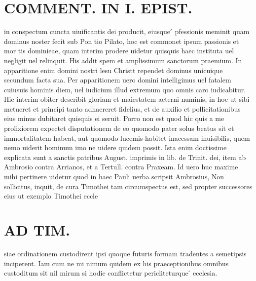 \documentclass{article}
\begin{document}
\begin{pages}
\section*{COMMENT. IN I. EPIST. }\pstart in conspectum cuncta uiuificantis dei producit, eiusque ́ pfessionis meminit quam dominus noster fecit sub Pon tio Pilato, hoc est commonet ipsum passionis et mor tis dominieae, quam interim prodere uidetur quisquis haec instituta uel negligit uel relinquit. His addit spem et amplissimum sanctorum praemium. In apparitione enim domini nostri lesu Christt rependet dominus unicuique secundum facta sua. Per apparitionem uero domini intelligimus uel fatalem cuiusuis hominis diem, uel iudicium illud extremum quo omnis caro iudicabitur. Hie interim obiter describit gloriam et maiestatem aeterni numinis, in hoc ut sibi metueret et principi tanto adhaereret fidelius, et de auxilio et pollicitationibus eius minus dubitaret quisquis ei seruit. Porro non est quod hic quis a me prolixiorem expectet disputationem de eo quomodo pater solus beatus sit et immortalitatem habeat, aut quomodo lucemis habitet inacessam inuisibilis, quem nemo uiderit hominum imo ne uidere quidem possit. Ista enim doctissime explicata sunt a sanctis patribus August. imprimis in lib. de Trinit. dei, item ab Ambrosio contra Arrianos, et a Tertull. contra Praxeam. Id uero huc maxime mihi pertinere uidetur quod in haec Pauli uerba scripsit Ambrosius, Non sollicitus, inquit, de cura Timothei tam circumspectus est, sed propter successores eius ut exemplo Timothei eccle\pend
\section*{AD TIM. }
\marginpar{[ p.172 ]}\pstart siae ordinationem custodirent ipsi quoque futuris formam tradentes a semetipsis inciperent. Iam cum ne mi nimum quidem ex his praeceptionibus omnibus custoditum sit nil mirum si hodie conflictetur pericliteturque ́ ecclesia.  \pend
{}
{}

\end{pages}
\end{document}

